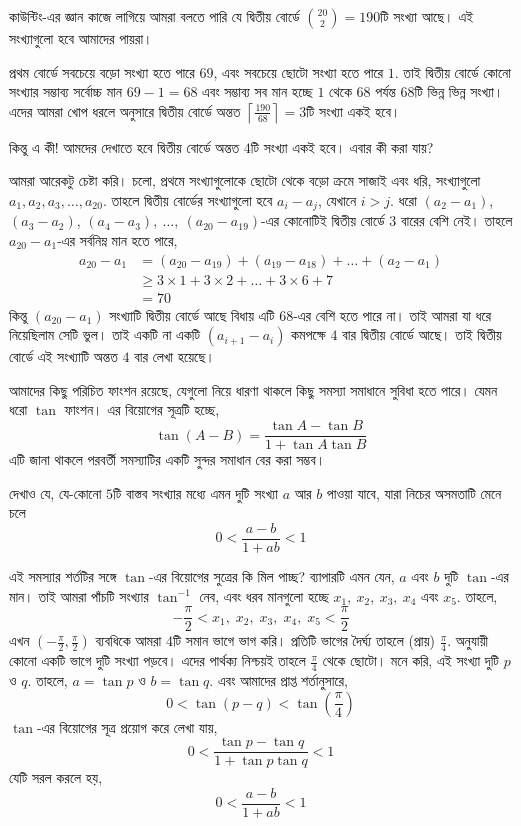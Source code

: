 \begin{solution}
	কাউন্টিং-এর জ্ঞান কাজে লাগিয়ে আমরা বলতে পারি যে দ্বিতীয় বোর্ডে $\binom{20}{2}=190$টি সংখ্যা আছে। এই সংখ্যাগুলো হবে আমাদের পায়রা।

	প্রথম বোর্ডে সবচেয়ে বড়ো সংখ্যা হতে পারে $69$, এবং সবচেয়ে ছোটো সংখ্যা হতে পারে $1$. তাই দ্বিতীয় বোর্ডে কোনো সংখ্যার সম্ভাব্য সর্বোচ্চ মান $69-1=68$ এবং সম্ভাব্য সব মান হচ্ছে $1$ থেকে $68$ পর্যন্ত $68$টি ভিন্ন ভিন্ন সংখ্যা। এদের আমরা খোপ ধরলে \phpname{} অনুসারে দ্বিতীয় বোর্ডে অন্তত $\left\lceil\frac{190}{68}\right\rceil=3$টি সংখ্যা একই হবে।

	কিন্তু এ কী! আমদের দেখাতে হবে দ্বিতীয় বোর্ডে অন্তত $4$টি সংখ্যা একই হবে। এবার কী করা যায়?

	আমরা আরেকটু চেষ্টা করি। চলো, প্রথমে সংখ্যাগুলোকে ছোটো থেকে বড়ো ক্রমে সাজাই এবং ধরি, সংখ্যাগুলো $a_1, a_2, a_3, \ldots, a_{20}$. তাহলে দ্বিতীয় বোর্ডের সংখ্যাগুলো হবে $a_i-a_j$, যেখানে $i>j$. ধরো $(a_2-a_1)$, $(a_3-a_2)$, $(a_4-a_3),\ \ldots,\ (a_{20}-a_{19})$-এর কোনোটিই দ্বিতীয় বোর্ডে $3$ বারের বেশি নেই। তাহলে $a_{20}-a_{1}$-এর সর্বনিম্ন মান হতে পারে,
	\begin{align*}
		a_{20}-a_1 &= (a_{20}-a_{19})+ (a_{19}-a_{18})+\ldots+(a_2-a_1)\\
				  &\ge 3\times 1+3\times 2+\ldots +3\times 6 +7\\
				  &=70
	\end{align*}
	কিন্তু $(a_{20}-a_{1})$ সংখ্যাটি দ্বিতীয় বোর্ডে আছে বিধায় এটি $68$-এর বেশি হতে পারে না। তাই আমরা যা ধরে নিয়েছিলাম সেটি ভুল। তাই একটি না একটি $(a_{i+1}-a_i)$ কমপক্ষে $4$ বার দ্বিতীয় বোর্ডে আছে। তাই দ্বিতীয় বোর্ডে এই সংখ্যাটি অন্তত $4$ বার লেখা হয়েছে।
\end{solution}

আমাদের কিছু পরিচিত ফাংশন রয়েছে, যেগুলো নিয়ে ধারণা থাকলে কিছু সমস্যা সমাধানে সুবিধা হতে পারে। যেমন ধরো $\tan$ ফাংশন। এর বিয়োগের সূত্রটি হচ্ছে,
\[\tan (A-B)=\frac{\tan A - \tan B}{1+\tan A \tan B}\]
এটি জানা থাকলে পরবর্তী সমস্যাটির একটি সুন্দর সমাধান বের করা সম্ভব।
\begin{example}
	দেখাও যে, যে-কোনো $5$টি বাস্তব সংখ্যার মধ্যে এমন দুটি সংখ্যা $a$ আর $b$ পাওয়া যাবে, যারা নিচের অসমতাটি মেনে চলে
	\[0<\dfrac{a-b}{1+ab}<1\]
\end{example}
\begin{solution}
	এই সমস্যার শর্তটির সঙ্গে $\tan$-এর বিয়োগের সুত্রের কি মিল পাচ্ছ? ব্যাপারটি এমন যেন, $a$ এবং $b$ দুটি $\tan$-এর মান। তাই আমরা পাঁচটি সংখ্যার $\tan ^{-1}$ নেব, এবং ধরব মানগুলো হচ্ছে $x_1,\ x_2,\ x_3,\ x_4$ এবং $x_5$. তাহলে,
	\[-\frac{\pi}{2}<x_1,\;x_2,\; x_3,\; x_4,\; x_5<\frac{\pi}{2}\]
	এখন $(-\frac\pi 2,\frac\pi 2)$ ব্যবধিকে আমরা $4$টি সমান ভাগে ভাগ করি। প্রতিটি ভাগের দৈর্ঘ্য তাহলে (প্রায়) $\frac \pi 4$. \phpname{} অনুযায়ী কোনো একটি ভাগে দুটি সংখ্যা পড়বে। এদের পার্থক্য নিশ্চয়ই তাহলে $\frac\pi 4$ থেকে ছোটো। মনে করি, এই সংখ্যা দুটি $p$ ও $q$. তাহলে, $a=\tan p$ ও $b=\tan q$. এবং আমাদের প্রাপ্ত শর্তানুসারে,
	\[0 < \tan(p-q) < \tan \left(\frac{\pi}{4}\right)\]
	$\tan$-এর বিয়োগের সূত্র প্রয়োগ করে লেখা যায়,
	\[0 < \frac{\tan p - \tan q}{1+\tan p\tan q} < 1\]
	যেটি সরল করলে হয়,
	\[0 < \frac{a-b}{1+ab} < 1\]
\end{solution}

